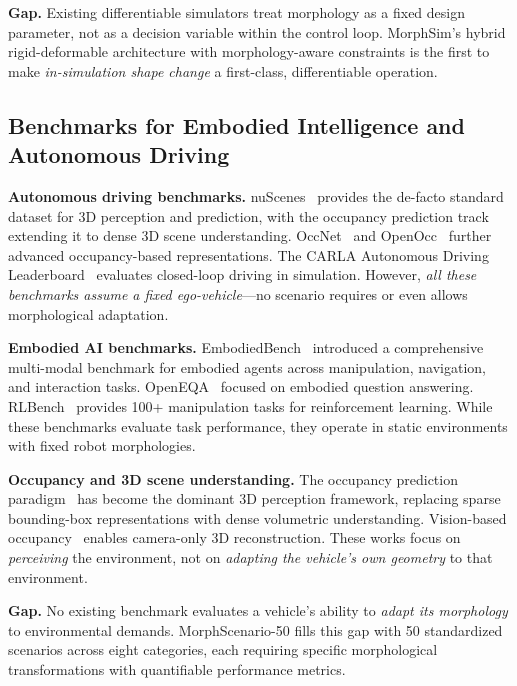 \textbf{Gap.} Existing differentiable simulators treat morphology as a fixed design parameter, not as a decision variable within the control loop. MorphSim's hybrid rigid-deformable architecture with morphology-aware constraints is the first to make \emph{in-simulation shape change} a first-class, differentiable operation.

\subsection{Benchmarks for Embodied Intelligence and Autonomous Driving}

\textbf{Autonomous driving benchmarks.}
nuScenes~\cite{nuscenes2020} provides the de-facto standard dataset for 3D perception and prediction, with the occupancy prediction track~\cite{occ3d2024} extending it to dense 3D scene understanding. OccNet~\cite{occnet2024} and OpenOcc~\cite{openocc2024} further advanced occupancy-based representations. The CARLA Autonomous Driving Leaderboard~\cite{carla_leaderboard2024} evaluates closed-loop driving in simulation. However, \emph{all these benchmarks assume a fixed ego-vehicle}---no scenario requires or even allows morphological adaptation.

\textbf{Embodied AI benchmarks.}
EmbodiedBench~\cite{embodiedbench2025} introduced a comprehensive multi-modal benchmark for embodied agents across manipulation, navigation, and interaction tasks. OpenEQA~\cite{openeqa2024} focused on embodied question answering. RLBench~\cite{rlbench2020} provides 100+ manipulation tasks for reinforcement learning. While these benchmarks evaluate task performance, they operate in static environments with fixed robot morphologies.

\textbf{Occupancy and 3D scene understanding.}
The occupancy prediction paradigm~\cite{occ_survey2025} has become the dominant 3D perception framework, replacing sparse bounding-box representations with dense volumetric understanding. Vision-based occupancy~\cite{vision_occ2024} enables camera-only 3D reconstruction. These works focus on \emph{perceiving} the environment, not on \emph{adapting the vehicle's own geometry} to that environment.

\textbf{Gap.} No existing benchmark evaluates a vehicle's ability to \emph{adapt its morphology} to environmental demands. MorphScenario-50 fills this gap with 50 standardized scenarios across eight categories, each requiring specific morphological transformations with quantifiable performance metrics.

